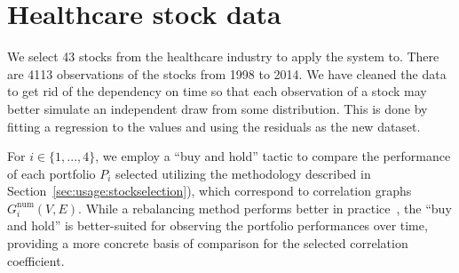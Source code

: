 \section{Healthcare stock data}
\label{sec:usage:data}

We select 43 stocks from the healthcare industry to apply the system to. There 
are 4113 observations of the stocks from 1998 to 2014. We have cleaned the data 
to get rid of the dependency on time so that each observation of a stock may 
better simulate an independent draw from some distribution. This is done by 
fitting a regression to the values and using the residuals as the new dataset.


For $i\in\{1,...,4\}$, 
we employ a ``buy and hold'' tactic to compare the performance of each 
portfolio $P_i$ selected utilizing the methodology described in 
Section~\ref{sec:usage:stockselection}), which correspond to correlation graphs 
$G_i^{\text{num}}(V,E)$. While a rebalancing method performs better in 
practice~\cite{liuh2016}, the ``buy and hold'' is better-suited for observing 
the portfolio performances over time, providing a more concrete basis of 
comparison for the selected correlation coefficient.
